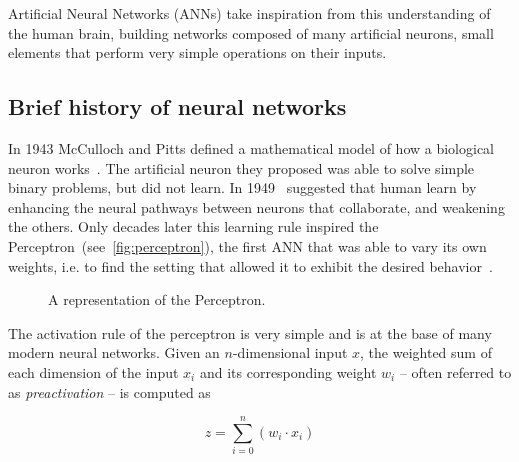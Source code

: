 Artificial Neural Networks (ANNs) take inspiration from this understanding of
the human brain, building networks composed of many artificial neurons, small
elements that perform very simple operations on their inputs.

\subsection{Brief history of neural networks}
In 1943 McCulloch and Pitts defined a mathematical model of how a biological
neuron works~\citep{McCulloch43}. The artificial neuron they proposed was
able to solve simple binary problems, but did not learn. In 1949~\cite{Hebb49}
suggested that human learn by enhancing the neural pathways between neurons
that collaborate, and weakening the others. Only decades later this learning
rule inspired the Perceptron~(see~\autoref{fig:perceptron}), the first ANN that
was able to vary its own weights, i.e. to find the setting that allowed it to
exhibit the desired behavior~\citep{Rosenblatt57}.

\begin{figure}[h]
    \centering
    \begin{neuralnetwork} [nodespacing=6mm, layerspacing=23mm,
            maintitleheight=2.5em, layertitleheight=5em,
            height=3, toprow=true, nodesize=17pt,
            style={}, title={}, titlestyle={}]

        \outputlayer[count=1, text=\nodetextsigma]
        {\setdefaultlinklabel{\wilink}\linklayers}
        \redefinelayerspacing{18mm}
        \outputlayer[count=1, text=\nodetextstep]
        \linklayers
        \redefinelayerspacing{16mm}
        \outputlayer[count=1, text=\nodetexty]
        \linklayers
    \end{neuralnetwork}
    \centering
    \caption{\label{fig:perceptron}A representation of the Perceptron.}
\end{figure}

The activation rule of the perceptron is very simple and is at the base of
many modern neural networks. Given an $n$-dimensional input $x$, the weighted
sum of each dimension of the input $x_i$ and its corresponding weight $w_i$ --
often referred to as \emph{preactivation} -- is
computed as

\begin{equation*}
    z = \sum_{i=0}^{n}(w_i \cdot x_i)
\end{equation*}

